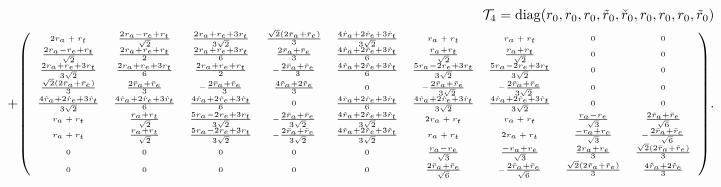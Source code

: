 \documentclass[aps,preprint,floats,epsf,epsfig,nofootinbib,letter]{revtex4}
\newcommand{\T}{{\cal T}}
\begin{document}
\begin{eqnarray}
&&\hspace{-0.5 cm}\T_4={\rm diag}(r_0,r_0,r_0,\tilde r_0,\check
r_0,r_0,r_0,r_0,\tilde r_0)
\nonumber\\
 &&\hspace{-0.5cm}+ \tiny{
 \left(
\begin{array}{ccccccccc}
2r_a+r_t
       &\frac{2r_a-r_e+r_t}{\sqrt2}
       &\frac{2r_a+r_e+3r_t}{3\sqrt2}
       &\frac{\sqrt2(2\bar r_a+\bar r_e)}{3}
       &\frac{4\hat r_a+2\hat r_e+3\hat r_t}{3\sqrt2}
       &r_a+r_t
       &r_a+r_t
       &0
       &0
       \\
\frac{2r_a-r_e+r_t}{\sqrt2}
       &\frac{2r_a+r_e+r_t}{2}
       &\frac{2r_a+r_e+3r_t}{6}
       &\frac{2\bar r_a+\bar r_e}{3}
       &\frac{4\hat r_a+2\hat r_e+3\hat r_t}{6}
       &\frac{r_a+r_t}{\sqrt2}
       &\frac{r_a+r_t}{\sqrt2}
       &0
       &0
       \\
\frac{2r_a+r_e+3r_t}{3\sqrt2}
       &\frac{2r_a+r_e+3r_t}{6}
       &\frac{2r_a+r_e+r_t}{2}
       &-\frac{2\bar r_a+\bar r_e}{3}
       &\frac{4\hat r_a+2\hat r_e+3\hat r_t}{6}
       &\frac{5r_a-2r_e+3r_t}{3\sqrt2}
       &\frac{5r_a-2r_e+3r_t}{3\sqrt2}
       &0
       &0
       \\
\frac{\sqrt2(2\bar r_a+\bar r_e)}{3}
       &\frac{2\bar r_a+\bar r_e}{3}
       &-\frac{2\bar r_a+\bar r_e}{3}
       &\frac{4\tilde r_a+2\tilde r_e}{3}
       &0
       &-\frac{2\bar r_a+\bar r_e}{3\sqrt2}
       &-\frac{2\bar r_a+\bar r_e}{3\sqrt2}
       &0
       &0
       \\
\frac{4\hat r_a+2\hat r_e+3\hat r_t}{3\sqrt2}
       &\frac{4\hat r_a+2\hat r_e+3\hat r_t}{6}
       &\frac{4\hat r_a+2\hat r_e+3\hat r_t}{6}
       &0
       &\frac{4\check r_a+2\check r_e+3\check r_t}{6}
       &\frac{4\hat r_a+2\hat r_e+3\hat r_t}{3\sqrt2}
       &\frac{4\hat r_a+2\hat r_e+3\hat r_t}{3\sqrt2}
       &0
       &0
       \\
r_a+r_t
       &\frac{r_a+r_t}{\sqrt2}
       &\frac{5r_a-2r_e+3r_t}{3\sqrt2}
       &-\frac{2\bar r_a+\bar r_e}{3\sqrt2}
       &\frac{4\hat r_a+2\hat r_e+3\hat r_t}{3\sqrt2}
       &2 r_a+r_t
       &r_a+r_t
       &\frac{r_a-r_e}{\sqrt3}
       &\frac{2\bar r_a+\bar r_e}{\sqrt6}
       \\
r_a+r_t
       &\frac{r_a+r_t}{\sqrt2}
       &\frac{5r_a-2r_e+3r_t}{3\sqrt2}
       &-\frac{2\bar r_a+\bar r_e}{3\sqrt2}
       &\frac{4\hat r_a+2\hat r_e+3\hat r_t}{3\sqrt2}
       &r_a+r_t
       &2r_a+r_t
       &\frac{-r_a+r_e}{\sqrt3}
       &-\frac{2\bar r_a+\bar r_e}{\sqrt6}
       \\
0
       &0
       &0
       &0
       &0
       &\frac{r_a-r_e}{\sqrt3}
       &\frac{-r_a+r_e}{\sqrt3}
       &\frac{2r_a+r_e}{3}
       &\frac{\sqrt2(2\bar r_a+\bar r_e)}{3}
       \\
0
       &0
       &0
       &0
       &0
       &\frac{2\bar r_a+\bar r_e}{\sqrt6}
       &-\frac{2\bar r_a+\bar r_e}{\sqrt6}
       &\frac{\sqrt2(2\bar r_a+\bar r_e)}{3}
       &\frac{4\tilde r_a+2\tilde r_e}{3}
       \end{array}
 \right)
 }.
 \nonumber\\
\label{eq:T4}
\end{eqnarray}
\end{document}
